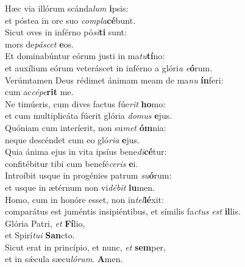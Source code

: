 \oddverse Hæc via illórum scánda\textit{lum} \textbf{i}psis:~\*\\
\oddverse et póstea in ore suo \textit{com}\textit{pla}\textbf{cé}bunt.\\
\evenverse Sicut oves in inférno pó\textit{si}\textbf{ti} sunt:~\*\\
\evenverse mors de\textit{pá}\textit{scet} \textbf{e}os.\\
\oddverse Et dominabúntur eórum justi in ma\textit{tu}\textbf{tí}no:~\*\\
\oddverse et auxílium eórum veteráscet in inférno a glóri\textit{a} \textit{e}\textbf{ó}rum.\\
\evenverse Verúmtamen Deus rédimet ánimam meam de ma\textit{nu} \textbf{ín}feri:~\*\\
\evenverse cum ac\textit{cé}\textit{pe}\textbf{rit} me.\\
\oddverse Ne timúeris, cum dives factus fúe\textit{rit} \textbf{ho}mo:~\*\\
\oddverse et cum multiplicáta fúerit glória \textit{do}\textit{mus} \textbf{e}jus.\\
\evenverse Quóniam cum interíerit, non su\textit{met} \textbf{óm}nia:~\*\\
\evenverse neque descéndet cum eo gló\textit{ri}\textit{a} \textbf{e}jus.\\
\oddverse Quia ánima ejus in vita ipsíus bene\textit{di}\textbf{cé}tur:~\*\\
\oddverse confitébitur tibi cum benefé\textit{ce}\textit{ris} \textbf{e}i.\\
\evenverse Introíbit usque in progénies patrum \textit{su}\textbf{ó}rum:~\*\\
\evenverse et usque in ætérnum non vi\textit{dé}\textit{bit} \textbf{lu}men.\\
\oddverse Homo, cum in honóre esset, non in\textit{tel}\textbf{lé}xit:~\*\\
\oddverse comparátus est juméntis insipiéntibus, et símilis fa\textit{ctus} \textit{est} \textbf{il}lis.\\
\evenverse Glória Patri, \textit{et} \textbf{Fí}lio,~\*\\
\evenverse et Spirí\textit{tu}\textit{i} \textbf{San}cto.\\
\oddverse Sicut erat in princípio, et nunc, \textit{et} \textbf{sem}per,~\*\\
\oddverse et in sǽcula sæcu\textit{ló}\textit{rum}. \textbf{A}men.\\
